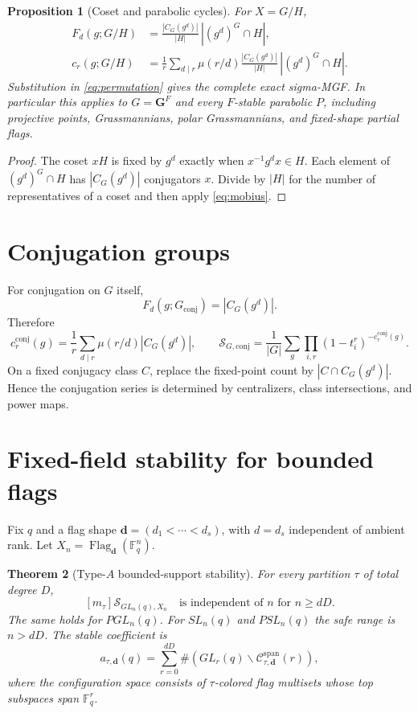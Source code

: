 \documentclass[11pt]{article}
\newtheorem{theorem}{Theorem}
\newtheorem{proposition}[theorem]{Proposition}
\newcommand{\MGF}{\mathcal S}
\newcommand{\F}{\mathbb F}
\begin{document}
\begin{proposition}[Coset and parabolic cycles]\label{prop:coset}
For $X=G/H$,
\begin{align}
F_d(g;G/H)&=\frac{|C_G(g^d)|}{|H|}\,|(g^d)^G\cap H|,\label{eq:cosetfixed}\\
c_r(g;G/H)&=\frac1r\sum_{d\mid r}\mu(r/d)
 \frac{|C_G(g^d)|}{|H|}\,|(g^d)^G\cap H|.\label{eq:cosetcycles}
\end{align}
Substitution in \eqref{eq:permutation} gives the complete exact sigma-MGF.
In particular this applies to $G=\mathbf G^F$ and every $F$-stable parabolic
$P$, including projective points, Grassmannians, polar Grassmannians, and
fixed-shape partial flags.
\end{proposition}

\begin{proof}
The coset $xH$ is fixed by $g^d$ exactly when $x^{-1}g^dx\in H$.  Each element
of $(g^d)^G\cap H$ has $|C_G(g^d)|$ conjugators $x$.  Divide by $|H|$ for the
number of representatives of a coset and then apply \eqref{eq:mobius}.
\end{proof}

\section{Conjugation groups}

For conjugation on $G$ itself,
\[
 F_d(g;G_{\mathrm{conj}})=|C_G(g^d)|.
\]
Therefore
\begin{equation}\label{eq:conjcycles}
c_r^{\mathrm{conj}}(g)=\frac1r\sum_{d\mid r}\mu(r/d)|C_G(g^d)|,
\qquad
\MGF_{G,\mathrm{conj}}=\frac1{|G|}\sum_g\prod_{i,r}
(1-t_i^r)^{-c_r^{\mathrm{conj}}(g)}.
\end{equation}
On a fixed conjugacy class $C$, replace the fixed-point count by
$|C\cap C_G(g^d)|$.  Hence the conjugation series is determined by
centralizers, class intersections, and power maps.

\section{Fixed-field stability for bounded flags}

Fix $q$ and a flag shape
$\mathbf d=(d_1<\cdots<d_s)$, with $d=d_s$ independent of ambient rank.  Let
$X_n=\operatorname{Flag}_{\mathbf d}(\F_q^n)$.

\begin{theorem}[Type-$A$ bounded-support stability]\label{thm:typeA}
For every partition $\tau$ of total degree $D$,
\begin{equation}\label{eq:typeAstable}
[m_\tau]\MGF_{GL_n(q),X_n}\quad\text{is independent of $n$ for }n\ge dD.
\end{equation}
The same holds for $PGL_n(q)$.  For $SL_n(q)$ and $PSL_n(q)$ the safe range is
$n>dD$.  The stable coefficient is
\begin{equation}\label{eq:stablecoefficient}
a_{\tau,\mathbf d}(q)=\sum_{r=0}^{dD}\#\left(
GL_r(q)\backslash\mathcal C_{\tau,\mathbf d}^{\mathrm{span}}(r)\right),
\end{equation}
where the configuration space consists of $\tau$-colored flag multisets whose
top subspaces span $\F_q^r$.
\end{theorem}
\end{document}
